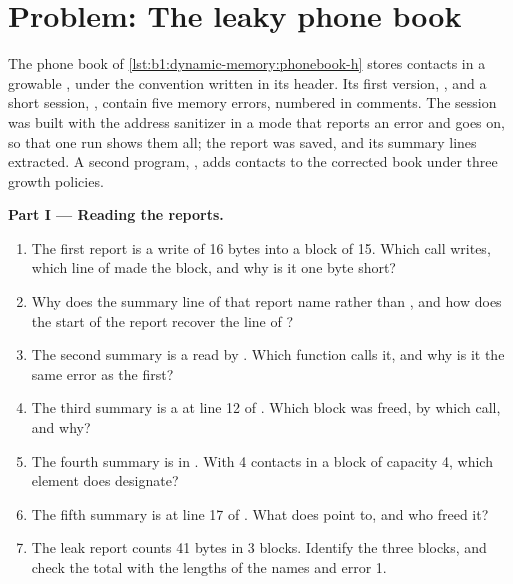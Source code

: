 \section{Problem: The leaky phone book}\label{sec:b1:dynamic-memory:problem}

\begin{problem}\label{pb:b1:dynamic-memory:1}
The phone book of \cref{lst:b1:dynamic-memory:phonebook-h} stores contacts in a growable , under the convention
written in its header. Its first version, , and a short session, , contain five
memory errors, numbered in comments. The session was built with the address sanitizer in a mode that reports an error
and goes on, so that one run shows them all; the report was saved, and its summary lines extracted. A second program,
, adds contacts to the corrected book under three growth policies.
\label{lst:b1:dynamic-memory:v0}
\label{lst:b1:dynamic-memory:pbdemo}
\label{out:b1:dynamic-memory:problem}
\label{out:b1:dynamic-memory:policies}

\medskip\noindent\textbf{Part I --- Reading the reports.}
\begin{enumerate}
\item The first report is a write of 16 bytes into a block of 15. Which call writes, which line of 
made the block, and why is it one byte short?
\item Why does the summary line of that report name  rather than , and how does the start of
the report recover the line of ?
\item The second summary is a read by . Which function calls it, and why is it the same error as the first?
\item The third summary is a  at line 12 of . Which block was freed, by which call, and
why?
\item The fourth summary is in . With 4 contacts in a block of capacity 4, which element does
 designate?
\item The fifth summary is at line 17 of . What does  point to, and who freed it?
\item The leak report counts 41 bytes in 3 blocks. Identify the three blocks, and check the total with the lengths of
the names and error 1.
\end{enumerate}


\end{problem}

